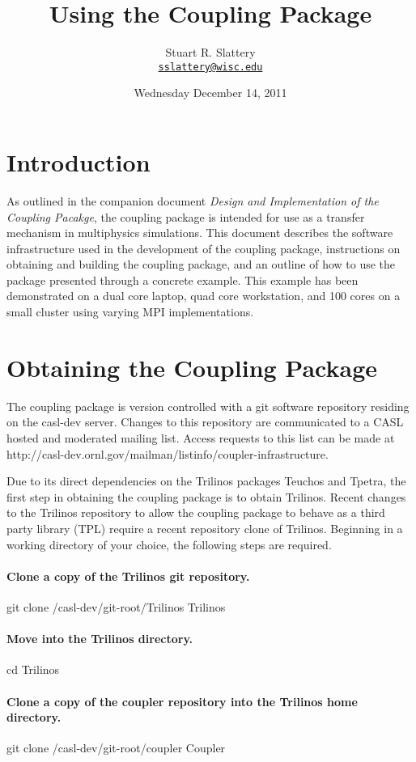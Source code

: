 \documentclass[letterpaper]{article}
\author{Stuart R. Slattery
\\ \href{mailto:sslattery@wisc.edu}{\texttt{sslattery@wisc.edu}}
}
\date{Wednesday December 14, 2011}
\title{Using the Coupling Package}
\begin{document}
\maketitle

\section{Introduction}
As outlined in the companion document {\sl Design and Implementation of
the Coupling Pacakge}, the coupling package is intended for use as a
transfer mechanism in multiphysics simulations. This document
describes the software infrastructure used in the development of the
coupling package, instructions on obtaining and building the coupling
package, and an outline of how to use the package presented through a
concrete example. This example has been demonstrated on a dual core laptop,
quad core workstation, and 100 cores on a small cluster using varying
MPI implementations.

\section{Obtaining the Coupling Package}
The coupling package is version controlled with a git software
repository residing on the casl-dev server. Changes to this repository
are communicated to a CASL hosted and moderated mailing list. Access
requests to this list can be made at
http://casl-dev.ornl.gov/mailman/listinfo/coupler-infrastructure.

Due to its direct dependencies on the Trilinos packages Teuchos and
Tpetra, the first step in obtaining the coupling package is to obtain
Trilinos. Recent changes to the Trilinos repository to allow the
coupling package to behave as a third party library (TPL) require a
recent repository clone of Trilinos. Beginning in a working directory
of your choice, the following steps are required.

\paragraph{Clone a copy of the Trilinos git repository.}
git clone /casl-dev/git-root/Trilinos Trilinos

\paragraph{Move into the Trilinos directory.}
cd Trilinos

\paragraph{Clone a copy of the coupler repository into the Trilinos
  home directory.} 
git clone /casl-dev/git-root/coupler Coupler
\end{document}
